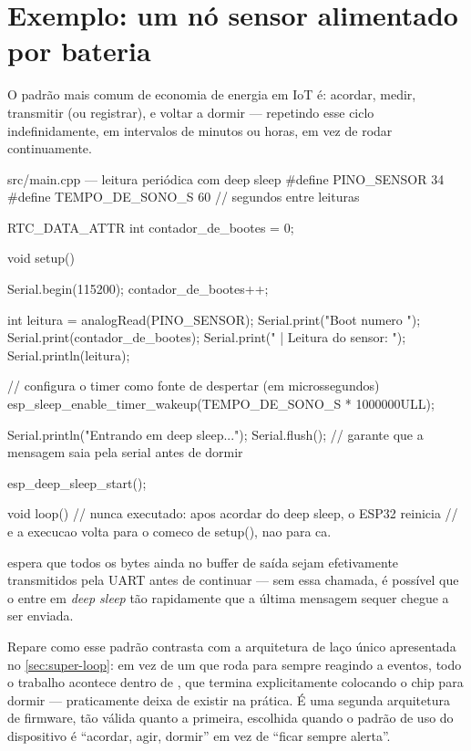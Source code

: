 \section{Exemplo: um nó sensor alimentado por bateria}

O padrão mais comum de economia de energia em IoT é: acordar, medir, transmitir (ou registrar), e voltar a dormir — repetindo esse ciclo indefinidamente, em intervalos de minutos ou horas, em vez de rodar continuamente.

\begin{codigoc}{src/main.cpp — leitura periódica com deep sleep}
#define PINO_SENSOR       34
#define TEMPO_DE_SONO_S   60   // segundos entre leituras

RTC_DATA_ATTR int contador_de_bootes = 0;

void setup() {
    Serial.begin(115200);
    contador_de_bootes++;

    int leitura = analogRead(PINO_SENSOR);
    Serial.print("Boot numero ");
    Serial.print(contador_de_bootes);
    Serial.print(" | Leitura do sensor: ");
    Serial.println(leitura);

    // configura o timer como fonte de despertar (em microssegundos)
    esp_sleep_enable_timer_wakeup(TEMPO_DE_SONO_S * 1000000ULL);

    Serial.println("Entrando em deep sleep...");
    Serial.flush();   // garante que a mensagem saia pela serial antes de dormir

    esp_deep_sleep_start();
}

void loop() {
    // nunca executado: apos acordar do deep sleep, o ESP32 reinicia
    // e a execucao volta para o comeco de setup(), nao para ca.
}
\end{codigoc}

\begin{nota}
 espera que todos os bytes ainda no buffer de saída sejam efetivamente transmitidos pela UART antes de continuar — sem essa chamada, é possível que o \ESP{} entre em \emph{deep sleep} tão rapidamente que a última mensagem sequer chegue a ser enviada.
\end{nota}

\begin{esp32box}
Repare como esse padrão contrasta com a arquitetura de laço único apresentada no \cref{sec:super-loop}: em vez de um  que roda para sempre reagindo a eventos, todo o trabalho acontece dentro de , que termina explicitamente colocando o chip para dormir —  praticamente deixa de existir na prática. É uma segunda arquitetura de firmware, tão válida quanto a primeira, escolhida quando o padrão de uso do dispositivo é ``acordar, agir, dormir'' em vez de ``ficar sempre alerta''.
\end{esp32box}

